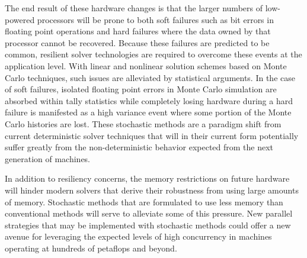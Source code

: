 The end result of these hardware changes is that the larger numbers of
low-powered processors will be prone to both soft failures such as bit
errors in floating point operations and hard failures where the data
owned by that processor cannot be recovered. Because these failures
are predicted to be common, resilient solver technologies are required
to overcome these events at the application level. With linear and
nonlinear solution schemes based on Monte Carlo techniques, such
issues are alleviated by statistical arguments. In the case of soft
failures, isolated floating point errors in Monte Carlo simulation are
absorbed within tally statistics while completely losing hardware
during a hard failure is manifested as a high variance event where
some portion of the Monte Carlo histories are lost. These stochastic
methods are a paradigm shift from current deterministic solver
techniques that will in their current form potentially suffer greatly
from the non-deterministic behavior expected from the next generation
of machines.

In addition to resiliency concerns, the memory restrictions on future
hardware will hinder modern solvers that derive their robustness from
using large amounts of memory. Stochastic methods that are formulated
to use less memory than conventional methods will serve to alleviate
some of this pressure. New parallel strategies that may
be implemented with stochastic methods could offer a new avenue for
leveraging the expected levels of high concurrency in machines
operating at hundreds of petaflops and beyond.

